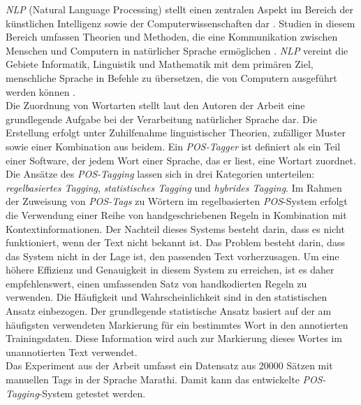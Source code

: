 \emph{NLP} (Natural Language Processing) stellt einen zentralen Aspekt im Bereich der künstlichen Intelligenz sowie der Computerwissenschaften dar \cite{kang2020natural}. Studien in diesem Bereich umfassen Theorien und Methoden, die eine Kommunikation zwischen Menschen und Computern in natürlicher Sprache ermöglichen \cite{kang2020natural}. \emph{NLP} vereint die Gebiete Informatik, Linguistik und Mathematik mit dem primären Ziel, menschliche Sprache in Befehle zu übersetzen, die von Computern ausgeführt werden können \cite{kang2020natural}.\\

Die Zuordnung von Wortarten stellt laut den Autoren \citeauthor{kumawat2015pos} der Arbeit \cite{kumawat2015pos} eine grundlegende Aufgabe bei der Verarbeitung natürlicher Sprache dar. Die Erstellung erfolgt unter Zuhilfenahme linguistischer Theorien, zufälliger Muster sowie einer Kombination aus beidem. Ein \emph{POS-Tagger} ist definiert als ein Teil einer Software, der jedem Wort einer Sprache, das er liest, eine Wortart zuordnet. Die Ansätze des \emph{POS-Tagging} lassen sich in drei Kategorien unterteilen: \emph{regelbasiertes Tagging}, \emph{statistisches Tagging} und \emph{hybrides Tagging}. Im Rahmen der Zuweisung von \emph{POS-Tags} zu Wörtern im regelbasierten \emph{POS}-System erfolgt die Verwendung einer Reihe von handgeschriebenen Regeln in Kombination mit Kontextinformationen. Der Nachteil dieses Systems besteht darin, dass es nicht funktioniert, wenn der Text nicht bekannt ist. Das Problem besteht darin, dass das System nicht in der Lage ist, den passenden Text vorherzusagen. Um eine höhere Effizienz und Genauigkeit in diesem System zu erreichen, ist es daher empfehlenswert, einen umfassenden Satz von handkodierten Regeln zu verwenden. Die Häufigkeit und Wahrscheinlichkeit sind in den statistischen Ansatz einbezogen. Der grundlegende statistische Ansatz basiert auf der am häufigsten verwendeten Markierung für ein bestimmtes Wort in den annotierten Trainingsdaten. Diese Information wird auch zur Markierung dieses Wortes im unannotierten Text verwendet.\\
Das Experiment aus der Arbeit umfasst ein Datensatz aus 20000 Sätzen mit manuellen Tags in der Sprache Marathi. Damit kann das entwickelte \emph{POS-Tagging}-System getestet werden. 


